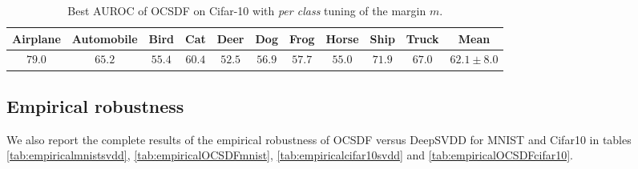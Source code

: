 \begin{table}%
    \centering
    \small
    \begin{tabular}{|cccccccccc|c|}
    \hline
    Airplane & Automobile & Bird & Cat & Deer & Dog & Frog & Horse & Ship & Truck & Mean\\
    \hline
    \hline
    $79.0$ & $65.2$ & $55.4$ & $60.4$ & $52.5$ & $56.9$ & $57.7$ & $55.0$ & $71.9$ & $67.0$ & $62.1\pm 8.0$\\
    \hline
    \end{tabular}
    \caption{Best AUROC of OCSDF on Cifar-10 with \textit{per class} tuning of the margin $m$.}
    \label{tab:cheatingprotocolcifar}
\end{table}

\subsection{Empirical robustness}

We also report the complete results of the empirical robustness of OCSDF versus DeepSVDD for MNIST and Cifar10 in tables \ref{tab:empiricalmnistsvdd}, \ref{tab:empiricalOCSDFmnist}, \ref{tab:empiricalcifar10svdd} and \ref{tab:empiricalOCSDFcifar10}.

